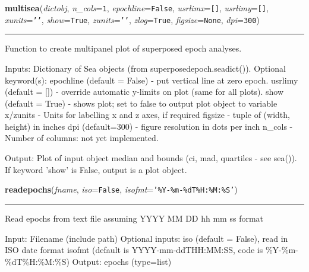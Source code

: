 \hspace{.8\funcindent}\begin{boxedminipage}{\funcwidth}

    \raggedright \textbf{multisea}(\textit{dictobj}, \textit{n\_cols}={\tt 1}, \textit{epochline}={\tt False}, \textit{usrlimx}={\tt \texttt{[}\texttt{]}}, \textit{usrlimy}={\tt \texttt{[}\texttt{]}}, \textit{xunits}={\tt \texttt{'}\texttt{}\texttt{'}}, \textit{show}={\tt True}, \textit{zunits}={\tt \texttt{'}\texttt{}\texttt{'}}, \textit{zlog}={\tt True}, \textit{figsize}={\tt None}, \textit{dpi}={\tt 300})

    \vspace{-1.5ex}

    \rule{\textwidth}{0.5\fboxrule}
\setlength{\parskip}{2ex}
    Function to create multipanel plot of superposed epoch analyses.

    Inputs: Dictionary of Sea objects (from superposedepoch.seadict()). 
    Optional keyword(s): epochline (default = False) - put vertical line at
    zero epoch. usrlimy (default = []) - override automatic y-limits on 
    plot (same for all plots). show (default = True) - shows plot; set to 
    false to output plot object to variable x/zunits - Units for labelling 
    x and z axes, if required figsize - tuple of (width, height) in inches 
    dpi (default=300) - figure resolution in dots per inch n\_cols - Number
    of columns: not yet implemented.

    Output: Plot of input object median and bounds (ci, mad, quartiles - 
    see sea()). If keyword 'show' is False, output is a plot object.

\setlength{\parskip}{1ex}
    \end{boxedminipage}

    \label{spacepy:seapy:readepochs}

    \vspace{0.5ex}

\hspace{.8\funcindent}\begin{boxedminipage}{\funcwidth}

    \raggedright \textbf{readepochs}(\textit{fname}, \textit{iso}={\tt False}, \textit{isofmt}={\tt \texttt{'}\texttt{\%Y-\%m-\%dT\%H:\%M:\%S}\texttt{'}})

    \vspace{-1.5ex}

    \rule{\textwidth}{0.5\fboxrule}
\setlength{\parskip}{2ex}
    Read epochs from text file assuming YYYY MM DD hh mm ss format

    Input: Filename (include path) Optional inputs: iso (default = False), 
    read in ISO date format isofmt (default is YYYY-mm-ddTHH:MM:SS, code is
    \%Y-\%m-\%dT\%H:\%M:\%S) Output: epochs (type=list)

\setlength{\parskip}{1ex}
    \end{boxedminipage}


